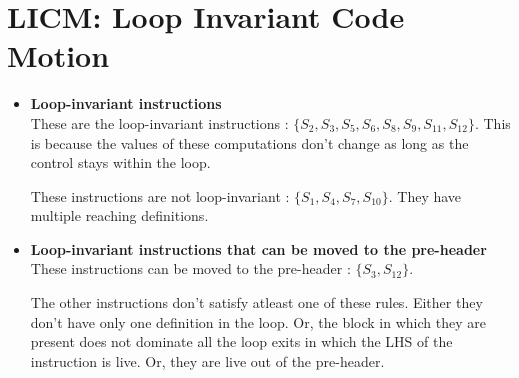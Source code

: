 \section{LICM: Loop Invariant Code Motion}

\begin{itemize}

\item{
    \textbf{Loop-invariant instructions}\\

    These are the loop-invariant instructions : $\{ S_{2}, S_{3}, S_{5}, S_{6}, S_{8}, S_{9}, S_{11}, S_{12} \}$.
    This is because the values of these computations  don't change as long as the control stays within
    the  loop.

    These instructions are not loop-invariant : $\{ S_{1}, S_{4}, S_{7}, S_{10} \}$. They have multiple
    reaching definitions.
  }

  \item{
    \textbf{Loop-invariant instructions that can be moved to the pre-header}\\

    These instructions can be moved to the pre-header : $\{ S_{3}, S_{12} \}$.

    The other instructions don't satisfy atleast one of these rules. Either they don't have only one definition in
    the loop. Or, the block in which they are present does not dominate all the loop exits in which the LHS
    of the instruction is live.
    Or, they are live out of the pre-header.
    
  }

\end{itemize}
